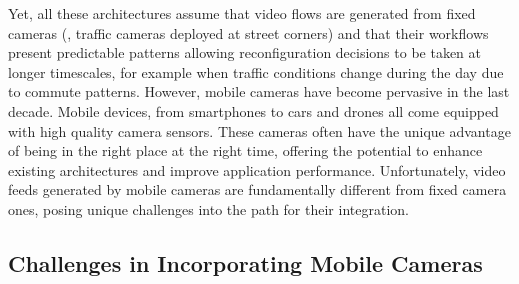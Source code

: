 Yet, all these architectures assume that video flows are generated from fixed cameras (\eg, traffic cameras deployed at street corners) and that their workflows present predictable patterns allowing reconfiguration decisions to be taken at longer timescales, for example when traffic conditions change during the day due to commute patterns. However, mobile cameras have become pervasive in the last decade. Mobile devices, from smartphones to cars and drones all come equipped with high quality camera sensors. These cameras often have the unique advantage of being in the right place at the right time, offering the potential to enhance existing architectures and improve application performance. Unfortunately, video feeds generated by mobile cameras are fundamentally different from fixed camera ones, posing unique challenges into the path for their integration. 


\subsection{Challenges in Incorporating Mobile Cameras}

